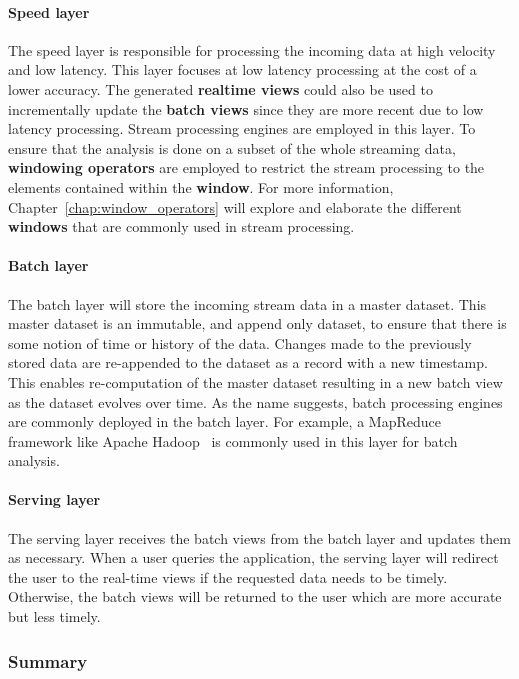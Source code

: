 \paragraph{Speed layer}%
\label{par:Speed layer}
The speed layer is responsible for processing the incoming data at high velocity and low latency. 
This layer focuses at low latency processing at the cost of a lower accuracy. The generated 
\textbf{realtime views}  could also be used to incrementally update the \textbf{batch views} since they 
are more recent due to low latency processing. Stream processing engines are employed in this 
layer. To ensure that the 
analysis is done on a subset of the whole streaming data, \textbf{windowing operators} are employed 
to restrict the stream processing to the elements contained within the \textbf{window}. For more information,
Chapter~\ref{chap:window_operators} will explore and elaborate the different \textbf{windows} that 
are commonly used in stream processing. 

\paragraph{Batch layer}%
\label{par:Batch layer}
The batch layer will store the incoming stream data in a master dataset. This master dataset is an immutable,
and append only dataset, to ensure that there is some notion of time or history of the data. Changes made to 
the previously stored data are re-appended to the dataset as a record with a new timestamp.  
This enables re-computation of the master dataset resulting in a new batch view as the dataset evolves over time. 
As the name suggests, batch processing engines are commonly deployed in the batch layer. For example, 
a MapReduce~\cite{mapreduce} framework like Apache Hadoop~\cite{hadoop} is commonly used in this 
layer for batch analysis. 


\paragraph{Serving layer}%
\label{par:Serving layer}

The serving layer receives the batch views from the batch layer and updates them as necessary. When a user 
queries the application, the serving layer will redirect the user to the real-time views if the 
requested data needs to be timely. Otherwise, the batch views will be returned to the user which are 
more accurate but less timely.  


\subsubsection{Summary}%
\label{ssub:Summary}

